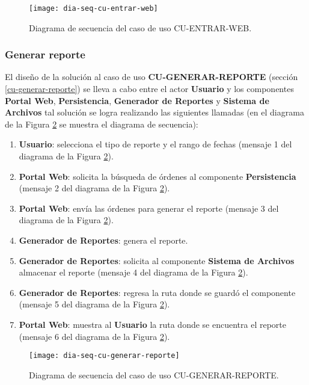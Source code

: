 \begin{figure}[h]
	\centering
	\texttt{[image: dia-seq-cu-entrar-web]}
	\caption{Diagrama de secuencia del caso de uso CU-ENTRAR-WEB.}
	\label{fig:dia-seq-cu-entrar-web}
\end{figure}

\subsubsection{Generar reporte}
El diseño de la solución al caso de uso \textbf{CU-GENERAR-REPORTE} (sección \ref{cu-generar-reporte}) se lleva a cabo entre el actor \textbf{Usuario} y los componentes \textbf{Portal Web}, \textbf{Persistencia}, \textbf{Generador de Reportes} y  \textbf{Sistema de Archivos} tal solución se logra realizando las siguientes llamadas (en el diagrama de la Figura \ref{fig:dia-seq-cu-generar-reporte} se muestra el diagrama de secuencia):
\begin{enumerate}
	\item \textbf{Usuario}: selecciona el tipo de reporte y el rango de fechas (mensaje 1 del diagrama de la Figura \ref{fig:dia-seq-cu-generar-reporte}).
	\item \textbf{Portal Web}: solicita la búsqueda de órdenes al componente \textbf{Persistencia} (mensaje 2 del diagrama de la Figura \ref{fig:dia-seq-cu-generar-reporte}).
	\item \textbf{Portal Web}: envía las órdenes para generar el reporte (mensaje 3 del diagrama de la Figura \ref{fig:dia-seq-cu-generar-reporte}).
	\item \textbf{Generador de Reportes}: genera el reporte.
	\item \textbf{Generador de Reportes}: solicita al componente \textbf{Sistema de Archivos} almacenar el reporte (mensaje 4 del diagrama de la Figura \ref{fig:dia-seq-cu-generar-reporte}).
	\item \textbf{Generador de Reportes}: regresa la ruta donde se guardó el componente (mensaje 5 del diagrama de la Figura \ref{fig:dia-seq-cu-generar-reporte}).
	\item \textbf{Portal Web}: muestra al \textbf{Usuario} la ruta donde se encuentra el reporte (mensaje 6 del diagrama de la Figura \ref{fig:dia-seq-cu-generar-reporte}).
\end{enumerate}

\begin{figure}[h]
	\centering
	\texttt{[image: dia-seq-cu-generar-reporte]}
	\caption{Diagrama de secuencia del caso de uso CU-GENERAR-REPORTE.}
	\label{fig:dia-seq-cu-generar-reporte}
\end{figure}

